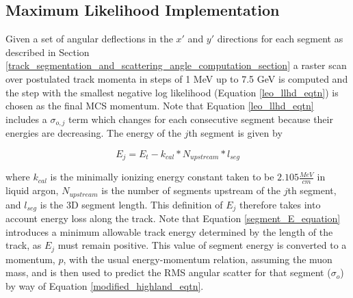 \documentclass[a4paper,11pt]{article}
\begin{document}
\subsection{Maximum Likelihood Implementation}\label{maximum_likelihood_section}

Given a set of angular deflections in the $x'$ and $y'$ directions for each segment as described in Section \ref{track_segmentation_and_scattering_angle_computation_section} a raster scan over postulated track momenta in steps of 1 MeV up to 7.5 GeV is computed and the step with the smallest negative log likelihood (Equation \ref{leo_llhd_eqtn}) is chosen as the final MCS momentum. Note that Equation \ref{leo_llhd_eqtn} includes a $\sigma_{o,j}$ term which changes for each consecutive segment because their energies are decreasing. The energy of the $j$th segment is given by

\begin{equation}\label{segment_E_equation}
E_{j} = E_t - k_{cal}*N_{upstream}*l_{seg}
\end{equation}

where $k_{cal}$ is the minimally ionizing energy constant taken to be $2.105 \frac{MeV}{cm}$ in liquid argon\cite{MIPenergysource}, $N_{upstream}$ is the number of segments upstream of the $j$th segment, and $l_{seg}$ is the 3D segment length. This definition of $E_j$ therefore takes into account energy loss along the track. Note that Equation \ref{segment_E_equation} introduces a minimum allowable track energy determined by the length of the track, as $E_{j}$ must remain positive. This value of segment energy is converted to a momentum, $p$, with the usual energy-momentum relation, assuming the muon mass, and is then used to predict the RMS angular scatter for that segment ($\sigma_o$) by way of Equation \ref{modified_highland_eqtn}. 
\end{document}
